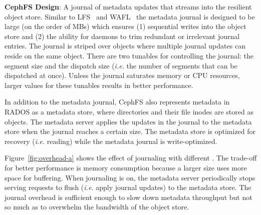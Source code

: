 \textbf{CephFS Design}: A journal of metadata updates that streams into the
resilient object store. Similar to LFS~\cite{rosenblum:acm1992-LFS} and
WAFL~\cite{hitz:wtec1994-WAFL} the metadata journal is designed to be large (on
the order of MBs) which ensures (1) sequential writes into the object store and
(2) the ability for daemons to trim redundant or irrelevant journal entries.
The journal is striped over objects where multiple journal updates can reside
on the same object. There are two tunables for controlling the journal: the segment size
and the dispatch size ({\it i.e.} the number of segments that can be dispatched
at once).  Unless the journal saturates memory or CPU resources, larger values
for these tunables results in better performance.

In addition to the metadata journal, CephFS also represents metadata in RADOS
as a metadata store, where directories and their file inodes are stored as
objects.  The metadata server applies the updates in the journal to the
metadata store when the journal reaches a certain size. The metadata store is
optimized for recovery ({\it i.e.} reading) while the metadata journal is
write-optimized.


Figure~\ref{fig:overhead-a} shows the effect of journaling with different
.  The trade-off for better performance is
memory consumption because a larger 
size uses more space for buffering.  When journaling is on, the metadata server
periodically stops serving requests to flush ({\it i.e.} apply journal updates)
to the metadata store.  The journal overhead is sufficient enough to slow down
metadata throughput but not so much as to overwhelm the bandwidth of the object
store.

